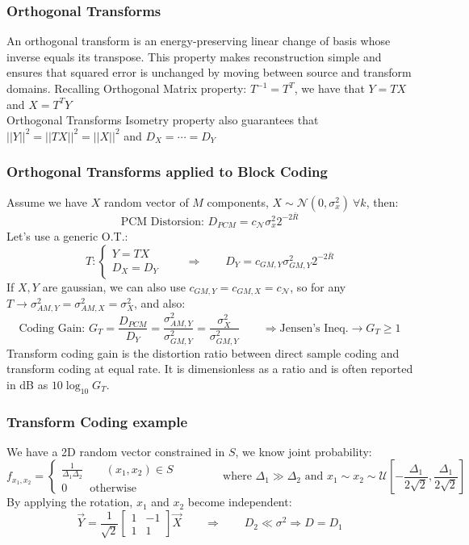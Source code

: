 \subsubsection{Orthogonal Transforms}
An orthogonal transform is an energy-preserving linear change of basis whose inverse equals its transpose. This property makes reconstruction simple and ensures that squared error is unchanged by moving between source and transform domains.
Recalling Orthogonal Matrix property: $T^{-1} = T^T$, we have that $Y = TX$ and $X = T^T Y$\\
Orthogonal Transforms Isometry property also guarantees that $||Y||^2 = ||TX||^2 = ||X||^2$ and $D_X = \cdots = D_Y$
\subsubsection{Orthogonal Transforms applied to Block Coding}
Assume we have $X$ random vector of $M$ components, $X \sim \mathcal{N}(0,\sigma^2_x) \ \forall k$, then:
$$\text{PCM Distorsion: } D_{PCM} = c_{\mathcal{N}}\sigma^2_x2^{-2\bar{R}}$$
Let's use a generic O.T.: $$T : \begin{cases}
    Y = TX\\
    D_X = D_Y
\end{cases} \qquad \Longrightarrow \qquad D_Y = c_{GM,Y}\sigma^2_{GM,Y}2^{-2\bar{R}}$$
If $X,Y$ are gaussian, we can also use $c_{GM,Y} = c_{GM,X }= c_{\mathcal{N}}$, so for any $T\to\sigma^2_{AM,Y} = \sigma^2_{AM,X} = \sigma^2_{X}$, and also:
$$\text{Coding Gain: }G_{T} = \frac{D_{PCM}}{D_Y} =\frac{\sigma^2_{AM,Y}}{\sigma^2_{GM,Y}}  =\frac{\sigma^2_X}{\sigma^2_{GM,Y}} \qquad \Longrightarrow \text{Jensen's Ineq.}\to G_T \geq 1$$
Transform coding gain is the distortion ratio between direct sample coding and transform coding at equal rate. It is dimensionless as a ratio and is often reported in dB as $10\log_{10}G_T$.
\subsubsection{Transform Coding example}
We have a 2D random vector constrained in $S$, we know joint probability:
$$f_{x_1,x_2} = \begin{cases}
    \frac{1}{\Delta_1\Delta_2} \qquad (x_1,x_2)\in S\\
    0 \qquad \text{otherwise}
\end{cases}\qquad\qquad\text{where }\Delta_1 \gg \Delta_2 \text{ and } x_1 \sim x_2 \sim \mathcal{U}\left[-\frac{\Delta_1}{2\sqrt{2}},\frac{\Delta_1}{2\sqrt{2}}\right]$$
By applying the rotation, $x_1$ and $x_2$ become independent:
$$\vec{Y} = \frac{1}{\sqrt{2}}\left[\begin{matrix}
    1 & -1\\
    1 & 1
\end{matrix}\right]\vec{X} \qquad \Longrightarrow \qquad D_2 \ll \sigma^2 \Longrightarrow D = D_1$$
